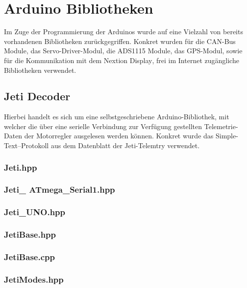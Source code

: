 \section{Arduino Bibliotheken}
Im Zuge der Programmierung der Arduinos wurde auf eine Vielzahl von bereits vorhandenen Bibliotheken zurückgegriffen. Konkret wurden für die CAN-Bus Module\textsuperscript{\cite{ArduinoBibliothekCANBus}}, 
das Servo-Driver-Modul\textsuperscript{\cite{ArduinoBibliothekServoPWM}}, 
die ADS1115 Module\textsuperscript{\cite{ArduinoBibliothekADS1115}},
das GPS-Modul\textsuperscript{\cite{ArduinoBibliothekGPS}},
sowie für die Kommunikation mit dem Nextion Display\textsuperscript{\cite{ArduinoBibliothekNextion}}, frei im Internet zugängliche Bibliotheken verwendet.
\subsection{Jeti Decoder}
Hierbei handelt es sich um eine selbstgeschriebene Arduino-Bibliothek, mit welcher die über eine serielle Verbindung zur Verfügung gestellten Telemetrie-Daten der Motorregler ausgelesen werden können. Konkret wurde das \glqq Simple-Text\grqq--Protokoll aus dem Datenblatt der Jeti-Telemtry\textsuperscript{\cite{JetiTelemtry}} verwendet.
\subsubsection{Jeti.hpp}

\subsubsection{Jeti\_ ATmega\_Serial1.hpp}

\subsubsection{Jeti\_UNO.hpp}

\subsubsection{JetiBase.hpp}

\subsubsection{JetiBase.cpp}


\subsubsection{JetiModes.hpp}
